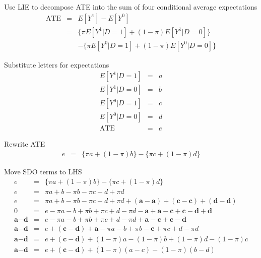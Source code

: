 \documentclass{beamer}
\begin{document}
\begin{frame}[shrink=20,plain]

  \begin{block}{Use LIE to decompose ATE into the sum of four conditional average expectations}
    \begin{eqnarray*}
      \text{ATE}&=&E[Y^1]-E[Y^0]  \\
      &=& \{\pi E[Y^1 | D=1] + (1-\pi)E[Y^1 | D=0]\}  \\
      & & - \{\pi E[Y^0|D=1] + (1-\pi) E[Y^0 | D=0]\}
    \end{eqnarray*}
  \end{block}


  \begin{block}{Substitute letters for expectations}
    \begin{eqnarray*}
      E[Y^1|D=1] &=& a  \\
      E[Y^1|D=0] &=& b  \\
      E[Y^0|D=1] &=& c  \\
      E[Y^0|D=0] &=& d  \\
      \text{ATE} &=& e
    \end{eqnarray*}
  \end{block}

  \begin{block}{Rewrite ATE}
    \begin{eqnarray*}
      e&=&\{\pi{a} + (1-\pi)b\} - \{\pi{c} + (1-\pi)d\}
    \end{eqnarray*}
  \end{block}

\end{frame}

\begin{frame}[plain]

  \begin{block}{Move SDO terms to LHS}
    \begin{eqnarray*}
      e&=&\{\pi{a} + (1-\pi)b\} - \{\pi{c} + (1-\pi)d\}  \\
      e&=&\pi{a} + b - \pi{b} - \pi{c} - d + \pi{d}  \\
      e&=&\pi{a} + b - \pi{b} - \pi{c} - d + \pi{d} + (\textbf{a} - \textbf{a}) + (\textbf{c} - \textbf{c}) + (\textbf{d} - \textbf{d})  \\
      0&=&e-\pi{a} - b + \pi{b} + \pi{c} + d - \pi{d} - \textbf{a} + \textbf{a} - \textbf{c} + \textbf{c} - \textbf{d} + \textbf{d}  \\
      \textbf{a}-\textbf{d}&=&e-\pi{a} - b + \pi{b} + \pi{c} + d - \pi{d}  + \textbf{a} - \textbf{c} + \textbf{c} - \textbf{d}  \\
      \textbf{a}-\textbf{d}&=&e  + (\textbf{c} - \textbf{d}) + \textbf{a}-\pi{a} - b + \pi{b} - \textbf{c} + \pi{c} + d - \pi{d} \\
      \textbf{a}-\textbf{d}&=&e  + (\textbf{c} - \textbf{d}) + (1-\pi)a -(1-\pi)b + (1-\pi)d - (1-\pi)c  \\
      \textbf{a}-\textbf{d}&=&e  + (\textbf{c} - \textbf{d}) + (1-\pi)(a-c) -(1-\pi)(b-d)
    \end{eqnarray*}
  \end{block}


\end{frame}
\end{document}
